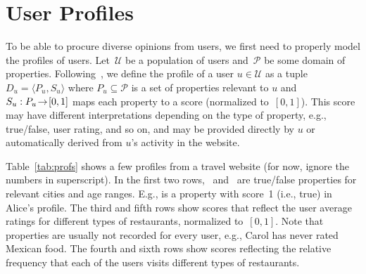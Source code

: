 \section{User Profiles}

\label{sec:prelim} 

\begin{table}
	{\small
	} 
\caption{Example user profiles}
\label{tab:profs} 
\end{table}

To be able to procure diverse opinions from users, we first need to properly model the profiles of users.    
Let~$\mathcal{U}$ be a population of users and~$\mathcal{P}$ be some domain of properties. Following~\cite{amsterdamer2016december}, we define the profile of a user $u\in \mathcal{U}$ as a tuple $D_u=\langle P_u, S_u \rangle$ where $P_u\subseteq\mathcal{P}$ is a set of properties relevant to $u$ and $S_u:P_u\!\rightarrow\! [0,1]$ maps each property to a score (normalized to~$[0,1]$). This score may have different interpretations depending on the type of property, e.g., true/false, user rating, and so on, and may be provided directly by $u$ or automatically derived from $u$'s activity in the website.  

\begin{example}
	Table~\ref{tab:profs} shows a few profiles from a travel website (for now, ignore the numbers in superscript). In the first two rows,  ~and~  are true/false properties for relevant cities and age ranges. E.g.,  is a property with score~1 (i.e., true) in Alice's profile. The third and fifth rows show scores that reflect the user average ratings for different types of restaurants, normalized to~$[0,1]$. Note that properties are usually not recorded for every user, e.g., Carol has never rated Mexican food. The fourth and sixth rows show scores reflecting the relative frequency that each of the users visits different types of restaurants.
\end{example}

